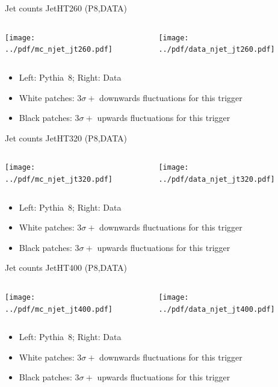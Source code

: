 \documentclass[9pt]{beamer}
\begin{document}
\begin{frame}[t]{Jet counts JetHT260 (P8,DATA)}
\begin{columns}[T]
  \begin{column}{.5\textwidth}
  \texttt{[image: ../pdf/mc\_njet\_jt260.pdf]}
  \end{column}
  \begin{column}{.5\textwidth}
  \texttt{[image: ../pdf/data\_njet\_jt260.pdf]}
  \end{column}
\end{columns}
\begin{itemize}
 \item Left: Pythia~8; Right: Data
 \item White patches: $3\sigma+$ downwards fluctuations for this trigger
 \item Black patches: $3\sigma+$ upwards fluctuations for this trigger
\end{itemize}
\end{frame}

\begin{frame}[t]{Jet counts JetHT320 (P8,DATA)}
\begin{columns}[T]
  \begin{column}{.5\textwidth}
  \texttt{[image: ../pdf/mc\_njet\_jt320.pdf]}
  \end{column}
  \begin{column}{.5\textwidth}
  \texttt{[image: ../pdf/data\_njet\_jt320.pdf]}
  \end{column}
\end{columns}
\begin{itemize}
 \item Left: Pythia~8; Right: Data
 \item White patches: $3\sigma+$ downwards fluctuations for this trigger
 \item Black patches: $3\sigma+$ upwards fluctuations for this trigger
\end{itemize}
\end{frame}

\begin{frame}[t]{Jet counts JetHT400 (P8,DATA)}
\begin{columns}[T]
  \begin{column}{.5\textwidth}
  \texttt{[image: ../pdf/mc\_njet\_jt400.pdf]}
  \end{column}
  \begin{column}{.5\textwidth}
  \texttt{[image: ../pdf/data\_njet\_jt400.pdf]}
  \end{column}
\end{columns}
\begin{itemize}
 \item Left: Pythia~8; Right: Data
 \item White patches: $3\sigma+$ downwards fluctuations for this trigger
 \item Black patches: $3\sigma+$ upwards fluctuations for this trigger
\end{itemize}
\end{frame}
\end{document}
